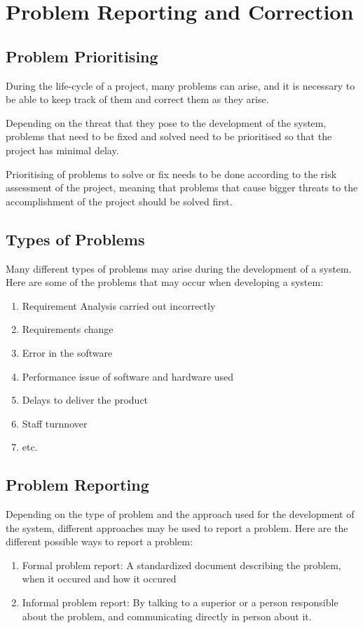 \chapter{Problem Reporting and Correction}
\section{Problem Prioritising}
During the life-cycle of a project, many problems can arise, and it is necessary to be able to keep track of them and correct them as they arise.

Depending on the threat that they pose to the development of the system, problems that need to be fixed and solved need to be prioritised so that the project has minimal delay.

Prioritising of problems to solve or fix needs to be done according to the risk assessment of the project, meaning that problems that cause bigger threats to the accomplishment of the project should be solved first.

\section{Types of Problems}
Many different types of problems may arise during the development of a system. Here are some of the problems that may occur when developing a system:
\begin{enumerate}
    \item Requirement Analysis carried out incorrectly
    \item Requirements change
    \item Error in the software
    \item Performance issue of software and hardware used
    \item Delays to deliver the product
    \item Staff turnnover
    \item etc.
\end{enumerate}

\section{Problem Reporting}
Depending on the type of problem and the approach used for the development of the system, different approaches may be used to report a problem. Here are the different possible ways to report a problem:
\begin{enumerate}
    \item Formal problem report: A standardized document describing the problem, when it occured and how it occured
    \item Informal problem report: By talking to a superior or a person responsible about the problem, and communicating directly in person about it.
\end{enumerate}

